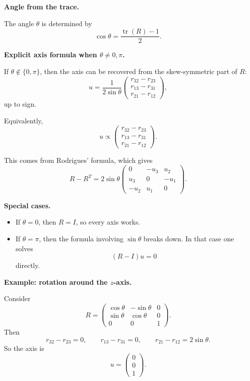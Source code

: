 \documentclass[12pt,a4paper]{article}
\theoremstyle{notespace}
\begin{document}
\medskip

\textbf{Angle from the trace.}

The angle \(\theta\) is determined by
\[
\cos\theta=\frac{\operatorname{tr}(R)-1}{2}.
\]

\medskip

\textbf{Explicit axis formula when \(\theta\neq 0,\pi\).}

If \(\theta\notin\{0,\pi\}\), then the axis can be recovered from the skew-symmetric part of \(R\):
\[
u=
\frac{1}{2\sin\theta}
\begin{pmatrix}
	r_{32}-r_{23}\\
	r_{13}-r_{31}\\
	r_{21}-r_{12}
\end{pmatrix},
\]
up to sign.

Equivalently,
\[
\boxed{
	u\propto
	\begin{pmatrix}
		r_{32}-r_{23}\\
		r_{13}-r_{31}\\
		r_{21}-r_{12}
	\end{pmatrix}.
}
\]

This comes from Rodrigues' formula, which gives
\[
R-R^T
=
2\sin\theta
\begin{pmatrix}
	0&-u_3&u_2\\
	u_3&0&-u_1\\
	-u_2&u_1&0
\end{pmatrix}.
\]

\medskip

\textbf{Special cases.}

\begin{itemize}
	\item If \(\theta=0\), then \(R=I\), so every axis works.
	\item If \(\theta=\pi\), then the formula involving \(\sin\theta\) breaks down. In that case one solves
	\[
	(R-I)u=0
	\]
	directly.
\end{itemize}

\medskip

\textbf{Example: rotation around the \(z\)-axis.}

Consider
\[
R=
\begin{pmatrix}
	\cos\theta & -\sin\theta & 0\\
	\sin\theta & \cos\theta & 0\\
	0&0&1
\end{pmatrix}.
\]
Then
\[
r_{32}-r_{23}=0,\qquad
r_{13}-r_{31}=0,\qquad
r_{21}-r_{12}=2\sin\theta.
\]
So the axis is
\[
u=
\begin{pmatrix}
	0\\
	0\\
	1
\end{pmatrix}.
\]
\end{document}
